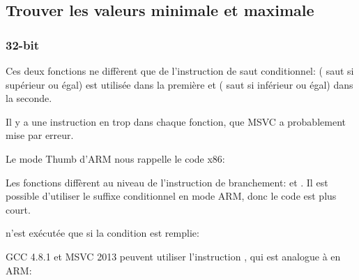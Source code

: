 ﻿\subsection{Trouver les valeurs minimale et maximale}

\subsubsection{32-bit}






Ces deux fonctions ne diffèrent que de l'instruction de saut conditionnel:
 ( saut si supérieur ou égal) est utilisée
dans la première et  ( saut si inférieur ou égal)
dans la seconde.

\myindex{\CompilerAnomaly}
\label{MSVC_double_JMP_anomaly}

Il y a une instruction \JMP en trop dans chaque fonction, que MSVC a probablement
mise par erreur.


Le mode Thumb d'ARM nous rappelle le code x86:




Les fonctions diffèrent au niveau de l'instruction de branchement:  et .
Il est possible d'utiliser le suffixe conditionnel en mode ARM, donc le code est plus
court.

 n'est exécutée que si la condition est remplie:



GCC 4.8.1 \Optimizing et MSVC 2013 \Optimizing peuvent utiliser l'instruction ,
qui est analogue à  en ARM:



